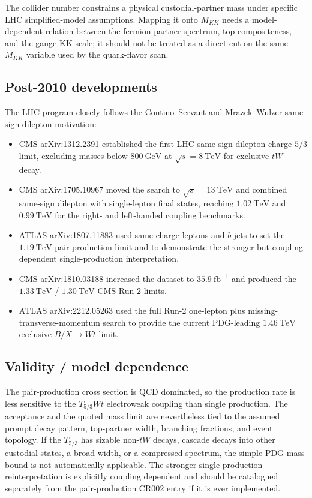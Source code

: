 The collider number constrains a physical custodial-partner mass under
specific LHC simplified-model assumptions.  Mapping it onto \(M_{KK}\) needs a
model-dependent relation between the fermion-partner spectrum, top
compositeness, and the gauge KK scale; it should not be treated as a direct
cut on the same \(M_{KK}\) variable used by the quark-flavor scan.

\subsection*{Post-2010 developments}
The LHC program closely follows the Contino--Servant and Mrazek--Wulzer
same-sign-dilepton motivation:
\begin{itemize}
  \item CMS arXiv:1312.2391 established the first LHC same-sign-dilepton
  charge-\(5/3\) limit, excluding masses below \(800~\mathrm{GeV}\) at
  \(\sqrt{s}=8~\mathrm{TeV}\) for exclusive \(tW\) decay.
  \item CMS arXiv:1705.10967 moved the search to \(\sqrt{s}=13~\mathrm{TeV}\)
  and combined same-sign dilepton with single-lepton final states, reaching
  \(1.02~\mathrm{TeV}\) and \(0.99~\mathrm{TeV}\) for the right- and
  left-handed coupling benchmarks.
  \item ATLAS arXiv:1807.11883 used same-charge leptons and \(b\)-jets to set
  the \(1.19~\mathrm{TeV}\) pair-production limit and to demonstrate the
  stronger but coupling-dependent single-production interpretation.
  \item CMS arXiv:1810.03188 increased the dataset to \(35.9~\mathrm{fb}^{-1}\)
  and produced the \(1.33~\mathrm{TeV}\) / \(1.30~\mathrm{TeV}\) CMS Run-2
  limits.
  \item ATLAS arXiv:2212.05263 used the full Run-2 one-lepton plus
  missing-transverse-momentum search to provide the current PDG-leading
  \(1.46~\mathrm{TeV}\) exclusive \(B/X\to Wt\) limit.
\end{itemize}

\subsection*{Validity / model dependence}
The pair-production cross section is QCD dominated, so the production rate is
less sensitive to the \(T_{5/3}Wt\) electroweak coupling than single
production.  The acceptance and the quoted mass limit are nevertheless tied to
the assumed prompt decay pattern, top-partner width, branching fractions, and
event topology.  If the \(T_{5/3}\) has sizable non-\(tW\) decays, cascade
decays into other custodial states, a broad width, or a compressed spectrum,
the simple PDG mass bound is not automatically applicable.  The stronger
single-production reinterpretation is explicitly coupling dependent and should
be catalogued separately from the pair-production CR002 entry if it is ever
implemented.

